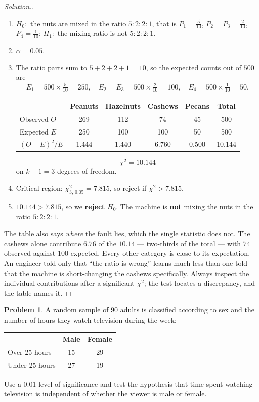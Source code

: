 \documentclass[11pt,a4paper]{article}
\theoremstyle{definition}
\newtheorem{problemx}{Problem}[section]
\newenvironment{problem}{\begin{problemx}}{\end{problemx}}
\newenvironment{solution}
  {\renewcommand{\qedsymbol}{}\begin{proof}[\textit{Solution}.]}
  {\end{proof}}
\begin{document}
\begin{solution}
\begin{enumerate}
\item $H_0:$ the nuts are mixed in the ratio $5:2:2:1$, that is
$P_1=\frac{5}{10}$, $P_2=P_3=\frac{2}{10}$, $P_4=\frac{1}{10}$;
$H_1:$ the mixing ratio is not $5:2:2:1$.
\item $\alpha=0.05$.
\item The ratio parts sum to $5+2+2+1=10$, so the expected counts out of $500$ are
\[E_1=500\times\tfrac{5}{10}=250,\quad E_2=E_3=500\times\tfrac{2}{10}=100,\quad
E_4=500\times\tfrac{1}{10}=50.\]
\begin{table}[H]
\centering
\begin{tabular}{l|cccc|c}
& Peanuts & Hazelnuts & Cashews & Pecans & Total\\
\hline
Observed $O$ & 269 & 112 & 74 & 45 & 500\\
Expected $E$ & 250 & 100 & 100 & 50 & 500\\
$(O-E)^2/E$ & 1.444 & 1.440 & 6.760 & 0.500 & 10.144\\
\end{tabular}
\end{table}
\[\chi^2=10.144\]
on $k-1=3$ degrees of freedom.
\item Critical region: $\chi^2_{3,\,0.05}=7.815$, so reject if $\chi^2>7.815$.
\item $10.144>7.815$, so we \textbf{reject} $H_0$. The machine is \textbf{not} mixing the
nuts in the ratio $5:2:2:1$.
\end{enumerate}

The table also says \emph{where} the fault lies, which the single statistic does not. The
cashews alone contribute $6.76$ of the $10.14$ --- two-thirds of the total --- with $74$
observed against $100$ expected. Every other category is close to its expectation. An
engineer told only that ``the ratio is wrong'' learns much less than one told that the
machine is short-changing the cashews specifically. Always inspect the individual
contributions after a significant $\chi^2$; the test locates a discrepancy, and the table
names it.
\end{solution}

\begin{problem}
A random sample of $90$ adults is classified according to sex and the number of hours they
watch television during the week:
\begin{table}[H]
\centering
\begin{tabular}{l|cc}
& Male & Female\\
\hline
Over 25 hours & 15 & 29\\
Under 25 hours & 27 & 19\\
\end{tabular}
\end{table}
Use a $0.01$ level of significance and test the hypothesis that time spent watching
television is independent of whether the viewer is male or female.
\end{problem}
\end{document}
